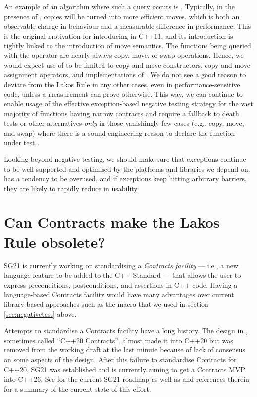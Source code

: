 An example of an algorithm where such a query occurs is . Typically, in the presence of , copies will be turned into more efficient moves, which is both an observable change in behaviour and a measurable difference in performance. This is the original motivation for introducing  in C++11, and its introduction is tightly linked to the introduction of move semantics. The functions being queried with the  operator are nearly always copy, move, or swap operations. Hence, we would expect use of  to be limited to copy and move constructors, copy and move assignment operators, and implementations of . We do not see a good reason to deviate from the Lakos Rule in any other cases, even in performance-sensitive code, unless a measurement can prove otherwise. This way, we can continue to enable usage of the effective exception-based negative testing strategy for the vast majority of functions having narrow contracts and require a fallback to death tests or other alternatives \emph{only} in those vanishingly few cases (e.g., copy, move, and swap) where there is a sound engineering reason to declare the function under test .

Looking beyond negative testing, we should make sure that exceptions continue to be well supported and optimised by the platforms and libraries we depend on.  has a tendency to be overused, and if exceptions keep hitting arbitrary  barriers, they are likely to rapidly reduce in usability. 

\section{Can Contracts make the Lakos Rule obsolete?}
\label{sec:contracts}

SG21 is currently working on standardising a \emph{Contracts facility} --- i.e., a new language feature to be added to the C++ Standard --- that allows the user to express preconditions, postconditions, and assertions in C++ code. Having a language-based Contracts facility would have many advantages over current library-based approaches such as the  macro that we used in section \ref{sec:negativetest} above.

Attempts to standardise a Contracts facility have a long history. The design in \cite{P0542R5}, sometimes called ``C++20 Contracts'', almost made it into C++20 but was removed from the working draft at the last minute because of lack of consensus on some aspects of the design. After this failure to standardise Contracts for C++20, SG21 was established and is currently aiming to get a Contracts MVP into C++26. See \cite{P2695R1} for the current SG21 roadmap as well as \cite{P2521R3} and references therein for a summary of the current state of this effort.

